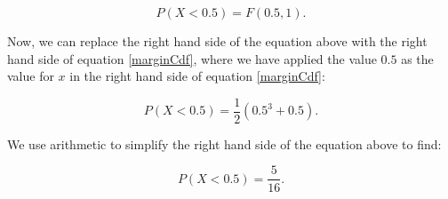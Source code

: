 \documentclass[a4paper,11pt]{article}
\begin{document}
\begin{equation}
P \left( X < 0.5 \right) = F\left(0.5, 1 \right).
\end{equation}

Now, we can replace the right hand side of the equation above with
the right hand side of equation \ref{marginCdf}, where we have
applied the value $0.5$ as the value for $x$ in the right hand
side of equation \ref{marginCdf}:

\begin{equation}
P \left( X < 0.5 \right) = \frac{1}{2}\left( 0.5^{3} + 0.5  \right).
\end{equation}

We use arithmetic to simplify the right hand side of the equation above to
find:

\begin{equation}
P \left( X < 0.5 \right) = \frac{5}{16}.
\end{equation}

\printbibliography{}
\end{document}
